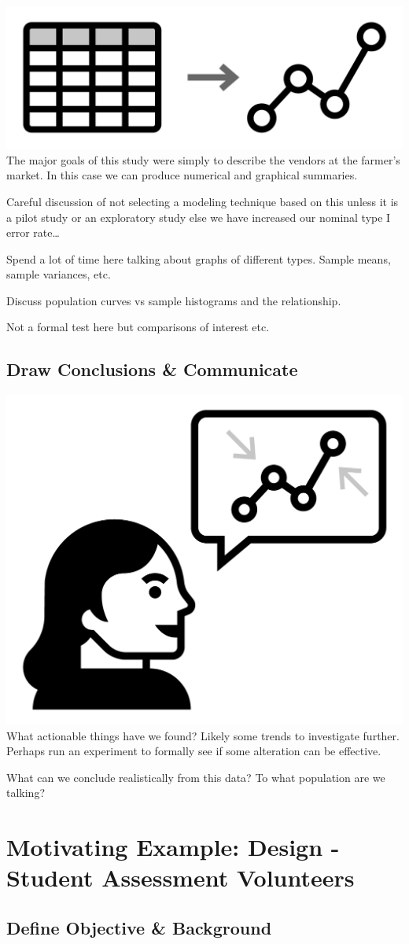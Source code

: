 \documentclass[
]{book}
\theoremstyle{definition}
\theoremstyle{definition}
\theoremstyle{definition}
\theoremstyle{remark}
\begin{document}
\includegraphics[width=0.13\linewidth,style="float:left; padding:10px"]{img/statsAnalysis}
The major goals of this study were simply to describe the vendors at the farmer's market. In this case we can produce numerical and graphical summaries.

Careful discussion of not selecting a modeling technique based on this unless it is a pilot study or an exploratory study else we have increased our nominal type I error rate\ldots{}

Spend a lot of time here talking about graphs of different types. Sample means, sample variances, etc.

Discuss population curves vs sample histograms and the relationship.

Not a formal test here but comparisons of interest etc.

\hypertarget{draw-conclusions-communicate}{%
\subsection{Draw Conclusions \& Communicate}\label{draw-conclusions-communicate}}

\includegraphics[width=0.13\linewidth,style="float:left; padding:10px"]{img/concludeCommunicate}
What actionable things have we found? Likely some trends to investigate further. Perhaps run an experiment to formally see if some alteration can be effective.

What can we conclude realistically from this data? To what population are we talking?

\hypertarget{motivating-example-design---student-assessment-volunteers}{%
\section{Motivating Example: Design - Student Assessment Volunteers}\label{motivating-example-design---student-assessment-volunteers}}

\hypertarget{define-objective-background-1}{%
\subsection{Define Objective \& Background}\label{define-objective-background-1}}
\end{document}
